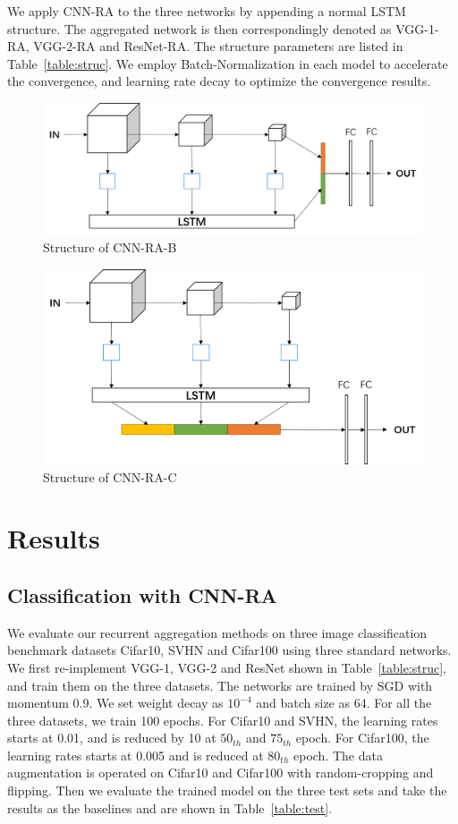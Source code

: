 \documentclass[conference]{IEEEtran}
\begin{document}
We apply CNN-RA to the three networks by appending a normal LSTM structure. The aggregated network is then correspondingly denoted as VGG-1-RA, VGG-2-RA and ResNet-RA. The structure parameters are listed in Table~\ref{table:struc}. We employ Batch-Normalization in each model to accelerate the convergence, and learning rate decay to optimize the convergence results.

\begin{figure}   
	\centering
	\includegraphics[width=12cm]{Figures/RA-B.png}
	\caption{Structure of CNN-RA-B}
	\label{fig:CNN-RA-B}
\end{figure}
\begin{figure}  
	\centering
	\includegraphics[width=12cm]{Figures/RA-C.png}
	\caption{Structure of CNN-RA-C}
	\label{fig:CNN-RA-C}
\end{figure}

\section{Results}

\subsection{Classification with CNN-RA}

We evaluate our recurrent aggregation methods on three image classification benchmark datasets Cifar10, SVHN and Cifar100 using three standard networks. We first re-implement VGG-1, VGG-2 and ResNet shown in Table~\ref{table:struc}, and train them on the three datasets. The networks are trained by SGD with momentum 0.9. We set weight decay as $10^{-4}$ and batch size as 64. For all the three datasets, we train 100 epochs. For Cifar10 and SVHN, the learning rates starts at 0.01, and is reduced by 10 at $50_{th}$ and $75_{th}$ epoch. For Cifar100, the learning rates starts at 0.005 and is reduced at $80_{th}$ epoch. The data augmentation is operated on Cifar10 and Cifar100 with random-cropping and flipping. Then we evaluate the trained model on the three test sets and take the results as the baselines and are shown in Table~\ref{table:test}.
\end{document}
